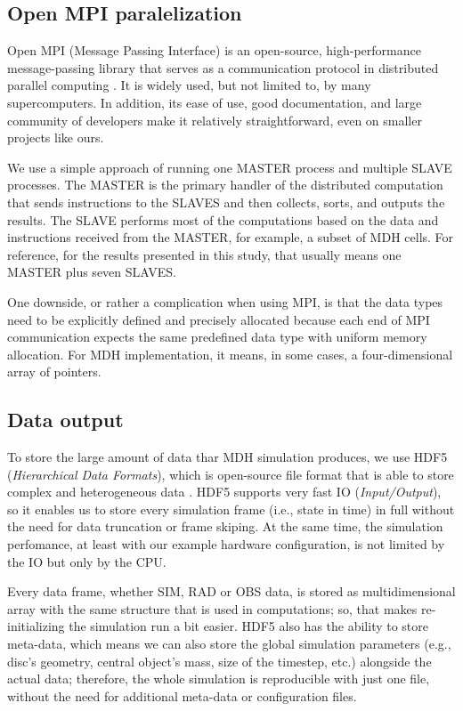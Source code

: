 \subsection{Open MPI paralelization}
    Open MPI (Message Passing Interface) is an open-source, high-performance message-passing library that serves as a communication protocol in distributed parallel computing \citep{openmpi2022}. It is widely used, but not limited to, by many supercomputers. In addition, its ease of use, good documentation, and large community of developers make it relatively straightforward, even on smaller projects like ours. 

    We use a simple approach of running one MASTER process and multiple SLAVE processes. The MASTER is the primary handler of the distributed computation that sends instructions to the SLAVES and then collects, sorts, and outputs the results. The SLAVE performs most of the computations based on the data and instructions received from the MASTER, for example, a subset of MDH cells. For reference, for the results presented in this study, that usually means one MASTER plus seven SLAVES.

    One downside, or rather a complication when using MPI, is that the data types need to be explicitly defined and precisely allocated because each end of MPI communication expects the same predefined data type with uniform memory allocation. For MDH implementation, it means, in some cases, a four-dimensional array of pointers.

\subsection{Data output}
    To store the large amount of data thar MDH simulation produces, we use HDF5 (\emph{Hierarchical Data Formats}), which is open-source file format that is able to store complex and heterogeneous data \citep{hdf5_2006}. HDF5 supports very fast IO (\emph{Input/Output}), so it enables us to store every simulation frame (i.e., state in time) in full without the need for data truncation or frame skiping. At the same time, the simulation perfomance, at least with our example hardware configuration, is not limited by the IO but only by the CPU. 

    Every data frame, whether SIM, RAD or OBS data, is stored as multidimensional array with the same structure that is used in computations; so, that makes re-initializing the simulation run a bit easier. HDF5 also has the ability to store meta-data, which means we can also store the global simulation parameters (e.g., disc's geometry, central object's mass, size of the timestep, etc.) alongside the actual data; therefore, the whole simulation is reproducible with just one file, without the need for additional meta-data or configuration files.

